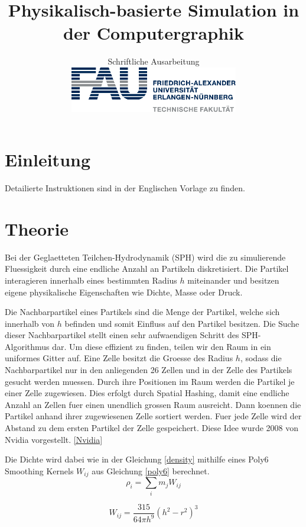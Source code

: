 \documentclass[a4paper]{paper}
\title{Physikalisch-basierte Simulation in der Computergraphik}
\subtitle{Schriftliche Ausarbeitung\\
\hfill\includegraphics[height=2cm]{fau-logo-tech.pdf}
\vspace{-2cm}}
\author{\ProjectTitle}
\newcommand{\StudentNames}{Liste der Studierenden}
\begin{document}
 
\twocolumn[\maketitle 
\textbf{\StudentNames} \\
\hrule\bigskip
]


\section{Einleitung} 
Detailierte Instruktionen sind in der Englischen Vorlage zu finden.

\section{Theorie}
Bei der Geglaetteten Teilchen-Hydrodynamik (SPH) wird die zu simulierende Fluessigkeit durch eine endliche Anzahl an Partikeln diskretisiert. Die Partikel interagieren innerhalb eines bestimmten Radius $h$ miteinander und besitzen eigene physikalische Eigenschaften wie  Dichte, Masse oder Druck.

Die Nachbarpartikel eines Partikels sind die Menge der Partikel, welche sich innerhalb von $h$ befinden und somit Einfluss auf den Partikel besitzen. Die Suche dieser Nachbarpartikel stellt einen sehr aufwaendigen Schritt des SPH-Algorithmus dar. Um diese effizient zu finden, teilen wir den Raum in ein uniformes Gitter auf. Eine Zelle besitzt die Groesse des Radius $h$, sodass die Nachbarpartikel nur in den anliegenden 26 Zellen und in der Zelle des Partikels gesucht werden muessen. Durch ihre Positionen im Raum werden die Partikel je einer Zelle zugewiesen. Dies erfolgt durch Spatial Hashing, damit eine endliche Anzahl an Zellen fuer einen unendlich grossen Raum ausreicht. Dann koennen die Partikel anhand ihrer zugewiesenen Zelle sortiert werden. Fuer jede Zelle wird der Abstand zu dem ersten Partikel der Zelle gespeichert. Diese Idee wurde 2008 von Nvidia vorgestellt. \ref{Nvidia}

Die Dichte wird dabei wie in der Gleichung \ref{density} mithilfe eines Poly6 Smoothing Kernels $W_{ij}$ aus Gleichung \ref{poly6} berechnet.
\begin{equation}
\label{density}
\rho_i = \sum_i{m_j W_{ij}}
\end{equation}

\begin{equation}
\label{poly6}
W_{ij} = \frac{315}{64 \pi h^9} (h^2-r^2)^3
\end{equation}
\end{document}
